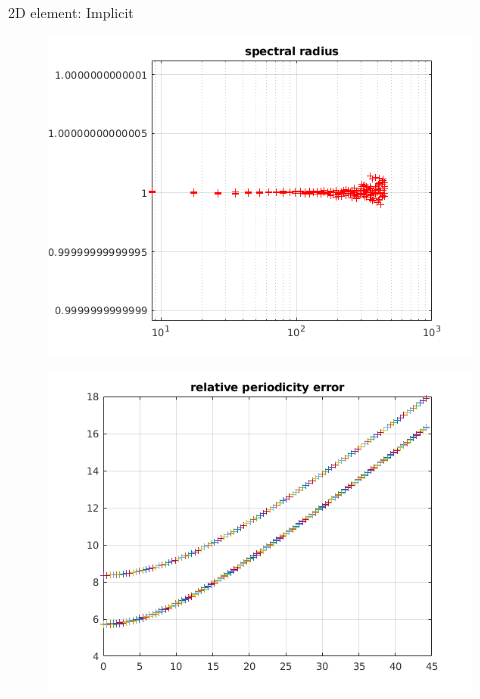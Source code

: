 \begin{frame}{2D element: Implicit}
\begin{figure}[ht]
\begin{minipage}[b]{0.5\linewidth}
  \end{minipage}%
  \begin{minipage}[b]{0.5\linewidth}
    \centering
    \includegraphics[scale=.35]{images/2D-imp-2.png} \\
  \end{minipage} 
  \begin{minipage}[b]{0.5\linewidth}
    \centering
    \includegraphics[scale=.35]{images/2D-imp-3.png} \\


\end{minipage}
\end{figure}
\end{frame}
